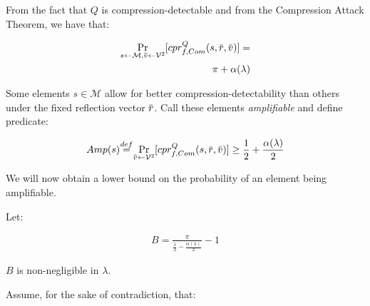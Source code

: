 \documentclass[conference, letterpaper, 10pt]{IEEEtran}
\newcommand\defeq{\stackrel{\mathclap{\normalfont\mbox{def}}}{=}}
\newcommand{\overbar}[1]{\mkern 1.5mu\overline{\mkern-1.5mu#1\mkern-1.5mu}\mkern 1.5mu}
\begin{document}
\begin{IEEEproof}

From the fact that $Q$ is compression-detectable and from the Compression Attack Theorem, we have that:

\begin{align*}
    \Pr_{s \leftarrow \mathcal{M},
         \overbar{v} \leftarrow \mathcal{V}^2}
         [cpr^Q_{f, Com}(s, \overbar{r}, \overbar{v})]
    =\\
    \pi + \alpha(\lambda)
\end{align*}

Some elements $s \in \mathcal{M}$ allow for better compression-detectability than others under the fixed
reflection vector $\overbar{r}$. Call these elements \textit{amplifiable} and define predicate:

\begin{align*}
    Amp(s) \defeq
    \Pr_{\overbar{v} \leftarrow \mathcal{V}^2}
    [cpr^Q_{f, Com}
     (s, \overbar{r}, \overbar{v})]
    \geq
    \frac{1}{2} + \frac{\alpha(\lambda)}{2}
\end{align*}

We will now obtain a lower bound on the probability of an element being amplifiable.

Let:


\begin{align*}
    B = \frac{\pi}{\frac{1}{2} - \frac{\alpha(\lambda)}{2}} - 1
\end{align*}

$B$ is non-negligible in $\lambda$.

Assume, for the sake of contradiction, that:


\end{IEEEproof}
\end{document}
